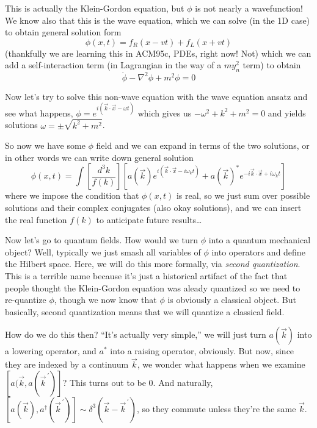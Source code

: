 \documentclass[10pt]{report}
\newcommand{\pvec}[1]{\vec{#1}^{\,\prime}}
\begin{document}
This is actually the Klein-Gordon equation, but $\phi$ is not nearly a wavefunction! We know also that this is the wave equation, which we can solve (in the 1D case) to obtain general solution form
\begin{equation}
    \phi(x,t) = f_R(x-vt) + f_L(x + vt)
\end{equation}
(thankfully we are learning this in ACM95c, PDEs, right now! Not) which we can add a self-interaction term (in Lagrangian in the way of a $my_n^2$ term) to obtain
\begin{equation}
    \ddot{\phi} - \nabla^2 \phi + m^2\phi = 0
\end{equation}

Now let's try to solve this non-wave equation with the wave equation ansatz and see what happens, $\phi = e^{i(\vec{k} \cdot \vec{x} - \omega t)}$ which gives us $-\omega^2 + k^2 + m^2 = 0$ and yields solutions $\omega = \pm \sqrt{k^2 + m^2}$. 

So now we have some $\phi$ field and we can expand in terms of the two solutions, or in other words we can write down general solution
\begin{equation}
    \phi(x,t) = \int \left[\frac{d^3k}{f(k)}\right]\left[ a(\vec{k})e^{i(\vec{k} \cdot \vec{x} - i\omega_kt)} + a(\vec{k})^* e^{-i\vec{k} \cdot \vec{x} + i \omega_k t} \right]
\end{equation}
where we impose the condition that $\phi(x,t)$ is real, so we just sum over possible solutions and their complex conjugates (also okay solutions), and we can insert the real function $f(k)$ to anticipate future results\dots

Now let's go to quantum fields. How would we turn $\phi$ into a quantum mechanical object? Well, typically we just smash all variables of $\phi$ into operators and define the Hilbert space. Here, we will do this more formally, via \emph{second quantization}. This is a terrible name because it's just a historical artifact of the fact that people thought the Klein-Gordon equation was aleady quantized so we need to re-quantize $\phi$, though we now know that $\phi$ is obviously a classical object. But basically, second quantization means that we will quantize a classical field.

How do we do this then? ``It's actually very simple,'' we will just turn $a(\vec{k})$ into a lowering operator, and $a^*$ into a raising operator, obviously. But now, since they are indexed by a continuum $\vec{k}$, we wonder what happens when we examine $\left[ a(\vec{k}, a(\pvec{k}) \right]$? This turns out to be $0$. And naturally, $[a(\vec{k}), a^\dagger(\pvec{k})] \sim \delta^3(\vec{k}  - \pvec{k})$, so they commute unless they're the same $\vec{k}$. 
\end{document}
